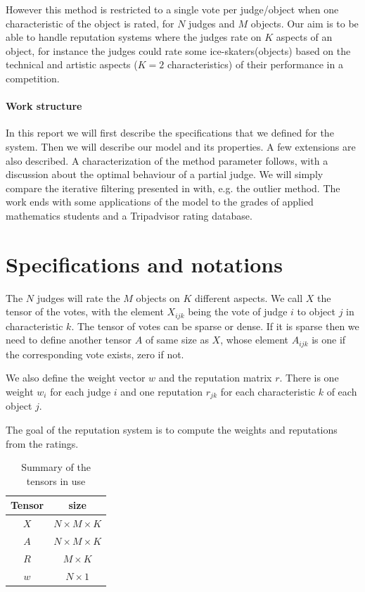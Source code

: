\documentclass[12pt,a4paper]{article}
\begin{document}
However this method is restricted to a single vote per judge/object when one characteristic of the object is rated, for $N$ judges and $M$ objects. Our aim is to be able to handle reputation systems where the judges rate on $K$ aspects of an object, for instance the judges could rate some ice-skaters(objects) based on the technical and artistic aspects ($K=2$ characteristics) of their performance in a competition. 

\paragraph{Work structure}
In this report we will first describe the specifications that we defined for the system. Then we will describe our model and its properties. A few extensions are also described. A characterization of the method parameter follows, with a discussion about the optimal behaviour of a partial judge. We will simply compare the iterative filtering presented in \cite{Cristo1} with, e.g. the outlier method. The work ends with some applications of the model to the grades of applied mathematics students and a Tripadvisor rating database.\\


\section{Specifications and notations}
The $N$ judges will rate the $M$ objects on $K$ different aspects. We call $X$ the tensor of the votes, with the element $X_{ijk}$ being the vote of judge $i$ to object $j$ in characteristic $k$. The tensor of votes can be sparse or dense. If it is sparse then we need to define another tensor $A$ of same size as $X$, whose element $A_{ijk}$ is one if the corresponding vote exists, zero if not.

We also define the weight vector $w$ and the reputation matrix $r$. There is one weight $w_i$ for each judge $i$ and one reputation $r_{jk}$ for each characteristic $k$ of each object $j$.

The goal of the reputation system is to compute the weights and reputations from the ratings.

\begin{table}
\centering
\begin{tabular}{|c|c|}
\hline 
Tensor & size\\
\hline
$X$ & $N\times M \times K$\\
\hline
$A$ & $N\times M \times K$\\
\hline
$R$ & $M\times K$\\
\hline
$w$ & $N\times 1$\\
\hline
\end{tabular}
\caption{Summary of the tensors in use}
\end{table}
\end{document}
